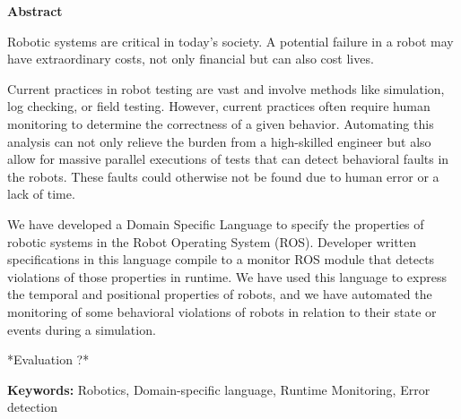 \vspace*{2cm}
\begin{center}
\Large \bf Abstract
\end{center}
\vspace*{1cm} \setlength{\baselineskip}{0.6cm}

Robotic systems are critical in today's society. A potential failure in a robot may have extraordinary costs, not only financial but can also cost lives.

Current practices in robot testing are vast and involve methods like simulation, log checking, or field testing. However, current practices often require human monitoring to determine the correctness of a given behavior. Automating this analysis can not only relieve the burden from a high-skilled engineer but also allow for massive parallel executions of tests that can detect behavioral faults in the robots. These faults could otherwise not be found due to human error or a lack of time.
    
We have developed a Domain Specific Language to specify the properties of robotic systems in the Robot Operating System (ROS). Developer written specifications in this language compile to a monitor ROS module that detects violations of those properties in runtime. We have used this language to express the temporal and positional properties of robots, and we have automated the monitoring of some behavioral violations of robots in relation to their state or events during a simulation.

*Evaluation ?*

\vfill

\begin{flushleft}
\textbf{Keywords:}
Robotics, Domain-specific language, Runtime Monitoring, Error detection
\end{flushleft}
